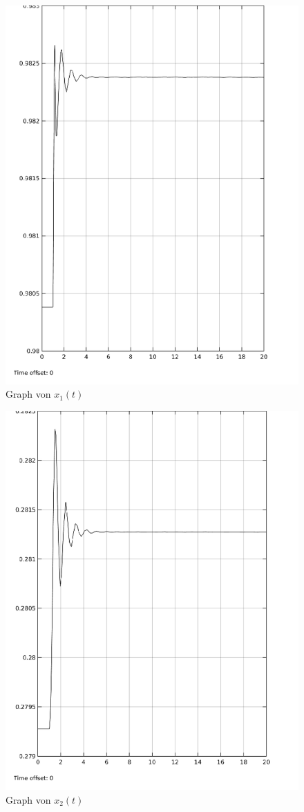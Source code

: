 \documentclass[10pt,a4paper]{article}
\begin{document}
  \begin{figure}[H]
	\centering
	\includegraphics[width=1\textwidth]{../aufgabe3/screens/x1_t}
	\caption{Graph von $x_1(t)$}
  \end{figure}

  \begin{figure}[H]
	\centering
	\includegraphics[width=1\textwidth]{../aufgabe3/screens/x2_t}
	\caption{Graph von $x_2(t)$}
  \end{figure}
\end{document}
